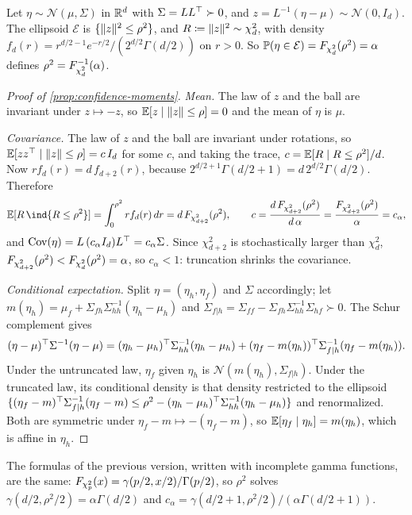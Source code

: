 Let $\eta \sim \mathcal{N}(\mu, \Sigma)$ in $\mathbb{R}^d$ with $\Sigma = LL^\top \succ 0$, and $z = L^{-1}(\eta - \mu) \sim \mathcal{N}(0, I_d)$.
The ellipsoid $\mathcal{E}$ is $\{\lVert z \rVert^2 \le \rho^2\}$, and $R \coloneqq \lVert z \rVert^2 \sim \chi^2_d$, with density
$f_d(r) = r^{d/2-1}e^{-r/2}/(2^{d/2}\Gamma(d/2))$ on $r > 0$.
So $\mathbb{P}(\eta\in\mathcal{E}) = F_{\chi^2_{d}}(\rho^2) = \alpha$ defines $\rho^2 = F_{\chi^2_{d}}^{-1}(\alpha)$.

\begin{proof}[Proof of \cref{prop:confidence-moments}]
\emph{Mean.} The law of $z$ and the ball are invariant under $z \mapsto -z$, so $\mathbb{E}[z \mid \lVert z \rVert \le \rho] = 0$ and the mean of $\eta$ is $\mu$.

\emph{Covariance.} The law of $z$ and the ball are invariant under rotations, so $\mathbb{E}[zz^\top \mid \lVert z \rVert \le \rho] = c\,I_d$ for some $c$,
and taking the trace, $c = \mathbb{E}[R \mid R \le \rho^2]/d$.
Now $r f_d(r) = d\, f_{d+2}(r)$, because $2^{d/2+1}\Gamma(d/2+1) = d\,2^{d/2}\Gamma(d/2)$.
Therefore
\[
\E[R\,\ind{R \le \rho^2}] = \int_0^{\rho^2} r f_d(r)\,dr = d\,\Fchi{d+2}(\rho^2),
\qquad
c = \frac{d\,\Fchi{d+2}(\rho^2)}{d\,\alpha} = \frac{\Fchi{d+2}(\rho^2)}{\alpha} = c_\alpha,
\]
and $\operatorname{Cov}(\eta) = L\,(c_\alpha I_d)L^\top = c_\alpha\Sigma$.
Since $\chi^2_{d+2}$ is stochastically larger than $\chi^2_d$, $F_{\chi^2_{d+2}}(\rho^2) < F_{\chi^2_{d}}(\rho^2) = \alpha$, so $c_\alpha < 1$:
truncation shrinks the covariance.

\emph{Conditional expectation.}
Split $\eta = (\eta_h, \eta_f)$ and $\Sigma$ accordingly; let $m(\eta_h) = \mu_f + \Sigma_{fh}\Sigma_{hh}^{-1}(\eta_h - \mu_h)$ and $\Sigma_{f|h} = \Sigma_{ff} - \Sigma_{fh}\Sigma_{hh}^{-1}\Sigma_{hf} \succ 0$.
The Schur complement gives
\[
(\eta - \mu)^\top\Sigma^{-1}(\eta - \mu) = (\eta_h - \mu_h)^\top\Sigma_{hh}^{-1}(\eta_h - \mu_h) + (\eta_f - m(\eta_h))^\top\Sigma_{f|h}^{-1}(\eta_f - m(\eta_h)).
\]
Under the untruncated law, $\eta_f$ given $\eta_h$ is $\mathcal{N}(m(\eta_h), \Sigma_{f|h})$.
Under the truncated law, its conditional density is that density restricted to the ellipsoid
$\{(\eta_f - m)^\top\Sigma_{f|h}^{-1}(\eta_f - m) \le \rho^2 - (\eta_h - \mu_h)^\top\Sigma_{hh}^{-1}(\eta_h - \mu_h)\}$ and renormalized.
Both are symmetric under $\eta_f - m \mapsto -(\eta_f - m)$, so $\mathbb{E}[\eta_f \mid \eta_h] = m(\eta_h)$, which is affine in $\eta_h$.
\end{proof}

The formulas of the previous version, written with incomplete gamma functions, are the same:
$F_{\chi^2_{p}}(x) = \gamma(p/2, x/2)/\Gamma(p/2)$, so $\rho^2$ solves $\gamma(d/2, \rho^2/2) = \alpha\Gamma(d/2)$
and $c_\alpha = \gamma(d/2+1, \rho^2/2)/(\alpha\Gamma(d/2+1))$.
